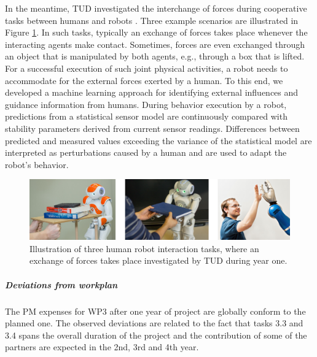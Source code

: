 \documentclass[12pt,a4paper,twoside]{article}
\begin{document}
In the meantime, TUD investigated the interchange of forces during cooperative tasks between humans and robots \cite{berger2013}. Three example scenarios are illustrated in Figure \ref{fig:interaction_tasks}. In such tasks, typically an exchange of forces takes place whenever the interacting agents make contact. Sometimes, forces are even exchanged through an object that is manipulated by both agents, e.g., through a box that is lifted. For a successful execution of such joint physical activities, a robot needs to accommodate for the external forces exerted by a human. To this end, we developed a machine learning approach for identifying external influences and guidance information from humans. During behavior execution by a robot, predictions from a statistical sensor model are continuously compared with stability parameters derived from current sensor readings. Differences between predicted and measured values exceeding the variance of the statistical model are interpreted as perturbations caused by a human and are used to adapt the robot's behavior.
    
\begin{figure}[!ht]
\centering
\includegraphics[width=\textwidth]{./images/interaction_wp3.png}
 \caption{Illustration of three human robot interaction tasks, where an exchange of forces takes place investigated by TUD during year one.
}
\label{fig:interaction_tasks}
\end{figure}

\subparagraph{Deviations from workplan}  

The PM expenses for WP3 after one year of project are globally conform to the planned one. The observed deviations are related to the fact that tasks 3.3 and 3.4 spans the overall duration of the project and the contribution of some of the partners are expected in the 2nd, 3rd and 4th year.
\end{document}
